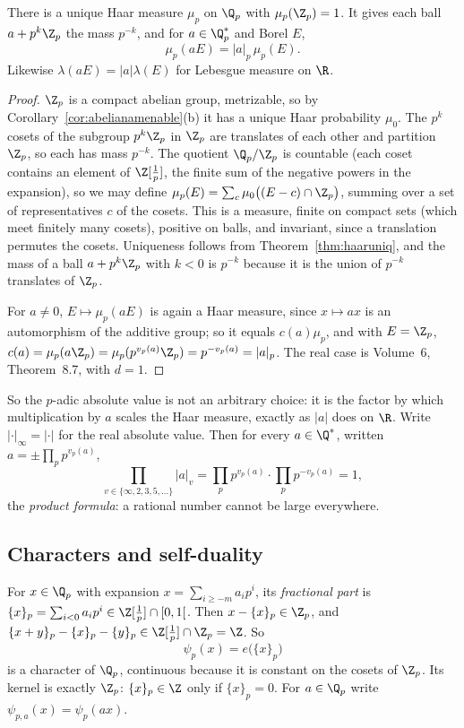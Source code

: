 \begin{proposition}\label{prop:haarqp}
There is a unique Haar measure $\mu_p$ on $\Q_p$ with $\mu_p(\Z_p)=1$. It gives each ball $a+p^k\Z_p$ the mass $p^{-k}$, and for $a\in\Q_p^*$ and Borel $E$,
\[\mu_p(aE)=|a|_p\,\mu_p(E).\]
Likewise $\lambda(aE)=|a|\lambda(E)$ for Lebesgue measure on $\R$.
\end{proposition}
\begin{proof}
$\Z_p$ is a compact abelian group, metrizable, so by Corollary~\ref{cor:abelianamenable}(b) it has a unique Haar probability $\mu_0$. The $p^k$ cosets of the subgroup $p^k\Z_p$
in $\Z_p$ are translates of each other and partition $\Z_p$, so each has mass $p^{-k}$. The quotient $\Q_p/\Z_p$ is countable (each coset contains an element of
$\Z[\frac1p]$, the finite sum of the negative powers in the expansion), so we may define $\mu_p(E)=\sum_c\mu_0\bigl((E-c)\cap\Z_p\bigr)$, summing over a set of
representatives $c$ of the cosets. This is a measure, finite on compact sets (which meet finitely many cosets), positive on balls, and invariant, since a
translation permutes the cosets. Uniqueness follows from Theorem~\ref{thm:haaruniq}, and the mass of a ball $a+p^k\Z_p$ with $k<0$ is $p^{-k}$ because it is the union of
$p^{-k}$ translates of $\Z_p$.

For $a\ne0$, $E\mapsto\mu_p(aE)$ is again a Haar measure, since $x\mapsto ax$ is an automorphism of the additive group; so it equals $c(a)\mu_p$, and with $E=\Z_p$,
$c(a)=\mu_p(a\Z_p)=\mu_p(p^{v_p(a)}\Z_p)=p^{-v_p(a)}=|a|_p$. The real case is Volume~6, Theorem~8.7, with $d=1$.
\end{proof}

So the $p$-adic absolute value is not an arbitrary choice: it is the factor by which multiplication by $a$ scales the Haar measure, exactly as $|a|$ does on
$\R$. Write $|\cdot|_\infty=|\cdot|$ for the real absolute value. Then for every $a\in\Q^*$, written $a=\pm\prod_pp^{v_p(a)}$,
\[\prod_{v\in\{\infty,2,3,5,\dots\}}|a|_v=\prod_pp^{v_p(a)}\cdot\prod_pp^{-v_p(a)}=1,\]
the \emph{product formula}: a rational number cannot be large everywhere.

\subsection*{Characters and self-duality}

For $x\in\Q_p$ with expansion $x=\sum_{i\ge-m}a_ip^i$, its \emph{fractional part} is $\{x\}_p=\sum_{i<0}a_ip^i\in\Z[\frac1p]\cap[0,1[$. Then $x-\{x\}_p\in\Z_p$, and
$\{x+y\}_p-\{x\}_p-\{y\}_p\in\Z[\frac1p]\cap\Z_p=\Z$. So
\[\psi_p(x)=e\bigl(\{x\}_p\bigr)\]
is a character of $\Q_p$, continuous because it is constant on the cosets of $\Z_p$. Its kernel is exactly $\Z_p$: $\{x\}_p\in\Z$ only if $\{x\}_p=0$. For $a\in\Q_p$ write
$\psi_{p,a}(x)=\psi_p(ax)$.

